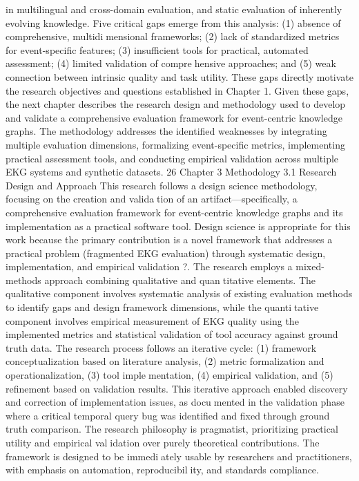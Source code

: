 in multilingual and cross-domain evaluation, and static evaluation of inherently evolving
knowledge.
Five critical gaps emerge from this analysis: (1) absence of comprehensive, multidimensional frameworks; (2) lack of standardized metrics for event-specific features; (3)
insufficient tools for practical, automated assessment; (4) limited validation of comprehensive approaches; and (5) weak connection between intrinsic quality and task utility.
These gaps directly motivate the research objectives and questions established in Chapter
1.
Given these gaps, the next chapter describes the research design and methodology
used to develop and validate a comprehensive evaluation framework for event-centric
knowledge graphs. The methodology addresses the identified weaknesses by integrating
multiple evaluation dimensions, formalizing event-specific metrics, implementing practical
assessment tools, and conducting empirical validation across multiple EKG systems and
synthetic datasets.
26
Chapter 3
Methodology
3.1 Research Design and Approach
This research follows a design science methodology, focusing on the creation and validation of an artifact—specifically, a comprehensive evaluation framework for event-centric
knowledge graphs and its implementation as a practical software tool. Design science
is appropriate for this work because the primary contribution is a novel framework that
addresses a practical problem (fragmented EKG evaluation) through systematic design,
implementation, and empirical validation ?.
The research employs a mixed-methods approach combining qualitative and quantitative elements. The qualitative component involves systematic analysis of existing
evaluation methods to identify gaps and design framework dimensions, while the quantitative component involves empirical measurement of EKG quality using the implemented
metrics and statistical validation of tool accuracy against ground truth data.
The research process follows an iterative cycle: (1) framework conceptualization based
on literature analysis, (2) metric formalization and operationalization, (3) tool implementation, (4) empirical validation, and (5) refinement based on validation results. This
iterative approach enabled discovery and correction of implementation issues, as documented in the validation phase where a critical temporal query bug was identified and
fixed through ground truth comparison.
The research philosophy is pragmatist, prioritizing practical utility and empirical validation over purely theoretical contributions. The framework is designed to be immediately usable by researchers and practitioners, with emphasis on automation, reproducibility, and standards compliance.
